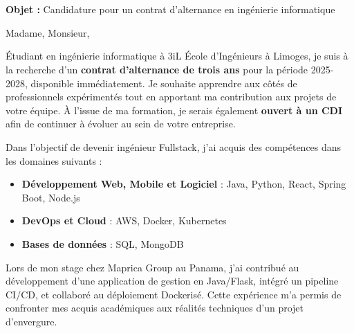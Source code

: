 \documentclass[11pt]{letter}
\makeatletter
\def\opening#1{\ifx\@empty\fromaddress\else
  \noindent\fromaddress \par
  \fi
  \vspace{2\parskip}%
  {\raggedright \toname \par}%
  \vspace{2\parskip}%
  #1\par\nobreak}%
\makeatother
\begin{document}
\vspace{1em}
\noindent \\ \\ \textbf{Objet :} Candidature pour un contrat d'alternance en ingénierie informatique
\opening{Madame, Monsieur,}

Étudiant en ingénierie informatique à 3iL École d'Ingénieurs à Limoges, je suis à la recherche d’un \textbf{contrat d’alternance de trois ans} pour la période 2025-2028, disponible immédiatement. Je souhaite apprendre aux côtés de professionnels expérimentés tout en apportant ma contribution aux projets de votre équipe. À l’issue de ma formation, je serais également \textbf{ouvert à un CDI} afin de continuer à évoluer au sein de votre entreprise.

Dans l’objectif de devenir ingénieur Fullstack, j’ai acquis des compétences dans les domaines suivants :

\begin{itemize}
  \item \textbf{Développement Web, Mobile et Logiciel} : Java, Python, React, Spring Boot, Node.js
  \item \textbf{DevOps et Cloud} : AWS, Docker, Kubernetes
  \item \textbf{Bases de données} : SQL, MongoDB
\end{itemize}

Lors de mon stage chez Maprica Group au Panama, j’ai contribué au développement d’une application de gestion en Java/Flask, intégré un pipeline CI/CD, et collaboré au déploiement Dockerisé. Cette expérience m’a permis de confronter mes acquis académiques aux réalités techniques d’un projet d’envergure.
\end{document}
